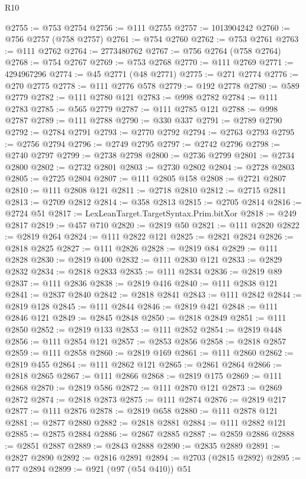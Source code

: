\begin{lexlean}{R10}
\begin{coremodule}
{{{{{{{{{{{{{{{{{{{{{{{{{{{{{{{{{{{{{{{{{{{{{{{{{{{{{{{{{{{{{{{{{{{{{{{{{{{{{{{{{{{{{{{{{{{{{{{{{{{{{{{{{{{{@2755 := @753 @2754
@2756 := @111 @2755
@2757 := 1013904242
@2760 := @756 @2757 (@758 @2757)
@2761 := @754 @2760
@2762 := @753 @2761
@2763 := @111 @2762
@2764 := 2773480762
@2767 := @756 @2764 (@758 @2764)
@2768 := @754 @2767
@2769 := @753 @2768
@2770 := @111 @2769
@2771 := 4294967296
@2774 := @45 @2771 (@48 @2771)
@2775 := @271 @2774
@2776 := @270 @2775
@2778 := @111 @2776 @578
@2779 := @192 @2778
@2780 := @589 @2779
@2782 := @111 @2780 @121
@2783 := @998 @2782
@2784 := @111 @2783
@2785 := @565 @2779
@2787 := @111 @2785 @121
@2788 := @998 @2787
@2789 := @111 @2788
@2790 := @330 @337
@2791 := @2789 @2790
@2792 := @2784 @2791
@2793 := @2770 @2792
@2794 := @2763 @2793
@2795 := @2756 @2794
@2796 := @2749 @2795
@2797 := @2742 @2796
@2798 := @2740 @2797
@2799 := @2738 @2798
@2800 := @2736 @2799
@2801 := @2734 @2800
@2802 := @2732 @2801
@2803 := @2730 @2802
@2804 := @2728 @2803
@2805 := @2725 @2804
@2807 := @111 @2805 @158
@2808 := @2721 @2807
@2810 := @111 @2808 @121
@2811 := @2718 @2810
@2812 := @2715 @2811
@2813 := @2709 @2812
@2814 := @358 @2813
@2815 := @2705 @2814
@2816 := @2724 @51
@2817 := LexLeanTarget.TargetSyntax.Prim.bitXor
@2818 := @249 @2817
@2819 := @457 @710
@2820 := @2819 @50
@2821 := @111 @2820
@2822 := @2819 @264
@2824 := @111 @2822 @121
@2825 := @2821 @2824
@2826 := @2818 @2825
@2827 := @111 @2826
@2828 := @2819 @84
@2829 := @111 @2828
@2830 := @2819 @400
@2832 := @111 @2830 @121
@2833 := @2829 @2832
@2834 := @2818 @2833
@2835 := @111 @2834
@2836 := @2819 @89
@2837 := @111 @2836
@2838 := @2819 @416
@2840 := @111 @2838 @121
@2841 := @2837 @2840
@2842 := @2818 @2841
@2843 := @111 @2842
@2844 := @2819 @128
@2845 := @111 @2844
@2846 := @2819 @421
@2848 := @111 @2846 @121
@2849 := @2845 @2848
@2850 := @2818 @2849
@2851 := @111 @2850
@2852 := @2819 @133
@2853 := @111 @2852
@2854 := @2819 @448
@2856 := @111 @2854 @121
@2857 := @2853 @2856
@2858 := @2818 @2857
@2859 := @111 @2858
@2860 := @2819 @169
@2861 := @111 @2860
@2862 := @2819 @455
@2864 := @111 @2862 @121
@2865 := @2861 @2864
@2866 := @2818 @2865
@2867 := @111 @2866
@2868 := @2819 @175
@2869 := @111 @2868
@2870 := @2819 @586
@2872 := @111 @2870 @121
@2873 := @2869 @2872
@2874 := @2818 @2873
@2875 := @111 @2874
@2876 := @2819 @217
@2877 := @111 @2876
@2878 := @2819 @658
@2880 := @111 @2878 @121
@2881 := @2877 @2880
@2882 := @2818 @2881
@2884 := @111 @2882 @121
@2885 := @2875 @2884
@2886 := @2867 @2885
@2887 := @2859 @2886
@2888 := @2851 @2887
@2889 := @2843 @2888
@2890 := @2835 @2889
@2891 := @2827 @2890
@2892 := @2816 @2891
@2894 := @2703 (@2815 @2892)
@2895 := @77 @2894
@2899 := @921 (@97 (@54 @410)) @51
}}}}}}}}}}}}}}}}}}}}}}}}}}}}}}}}}}}}}}}}}}}}}}}}}}}}}}}}}}}}}}}}}}}}}}}}}}}}}}}}}}}}}}}}}}}}}}}}}}}}}}}}}}}}
\end{coremodule}
\end{lexlean}
